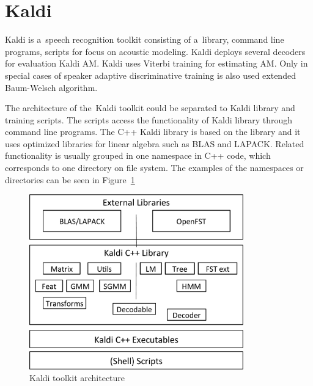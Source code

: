 {\section{Kaldi}
\label{sec:back_kaldi}

Kaldi is a~speech recognition toolkit consisting of a~library, command line programs, scripts for focus on acoustic modeling.
Kaldi deploys several decoders for evaluation Kaldi \ac{AM}.
Kaldi uses Viterbi training for estimating \ac{AM}. 
Only in special cases of speaker adaptive discriminative training is also used extended Baum-Welsch algorithm\cite{povey2011kaldi}.

The architecture of the~Kaldi toolkit could be separated to Kaldi library and training scripts.
The scripts access the functionality of Kaldi library through command line programs.
The C++ Kaldi library is based on the \cite{allauzen2007openfst} library and it uses optimized libraries for linear algebra such as BLAS and LAPACK.
Related functionality is usually grouped in one namespace in C++ code, which corresponds to one directory on file system. 
The examples of the namespaces or directories can be seen in Figure~\ref{fig:kaldi_arch}

\begin{figure}[!htp]
    \begin{center}
        \includegraphics[width=25em]{images/kaldi-lib}
        \caption{Kaldi toolkit architecture\cite{povey2011kaldi}}
        \label{fig:kaldi_arch} 
    \end{center}
\end{figure}

}

